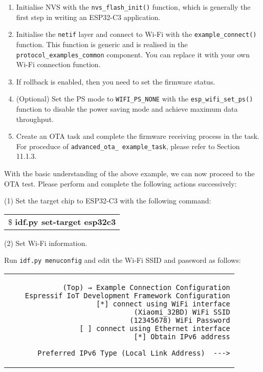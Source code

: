 \documentclass[a4paper,12pt]{book}
\begin{document}
\begin{enumerate}[label=\alph*.]
    \item Initialise NVS with the \verb|nvs_flash_init()| function, which is generally the first step in writing an ESP32-C3 application.
    \item Initialise the \verb|netif| layer and connect to Wi-Fi with the \verb|example_connect()| function. This function is generic and is realised in the \verb|protocol_examples_common| component. You can replace it with your own Wi-Fi connection function.
    \item If rollback is enabled, then you need to set the firmware status.
    \item (Optional) Set the PS mode to \verb|WIFI_PS_NONE| with the \verb|esp_wifi_set_ps()| function to disable the power saving mode and achieve maximum data throughput.
    \item Create an OTA task and complete the firmware receiving process in the task. For proceduce of \verb|advanced_ota_ example_task|, please refer to Section 11.1.3.
\end{enumerate}

With the basic understanding of the above example, we can now proceed to the OTA test. Please perform and complete the following actions successively:

(1) Set the target chip to ESP32-C3 with the following command:

\begin{codebloc}
\begin{tabular}{d}
\$ \textbf{idf.py set-target esp32c3}
\end{tabular}
\end{codebloc}

\vspace{6pt}
(2) Set Wi-Fi information.

Run \verb|idf.py menuconfig| and edit the Wi-Fi SSID and password as follows:

\begin{codebloc}
\begin{tabular}{d}
\vspace{2pt}
\begin{verbatim}
(Top) → Example Connection Configuration
    Espressif IoT Development Framework Configuration
[*] connect using WiFi interface
(Xiaomi_32BD) WiFi SSID
(12345678) WiFi Password
[ ] connect using Ethernet interface
[*] Obtain IPv6 address
\end{verbatim}
\verb|    Preferred IPv6 Type (Local Link Address)  --->|
\end{tabular}
\end{codebloc}
\end{document}
